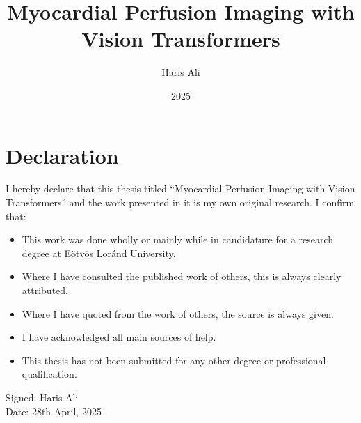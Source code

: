 \documentclass[
]{elteikthesis}[2024/04/26]
\title{Myocardial Perfusion Imaging with Vision Transformers} %
\date{2025} %
\author{Haris Ali}
\affiliation{PhD Candidate} %
\begin{document}


\maketitle
%

\chapter*{Declaration}

I hereby declare that this thesis titled “Myocardial Perfusion Imaging with Vision Transformers” and the work presented in it is my own original research. I confirm that:

\begin{itemize}
    \item This work was done wholly or mainly while in candidature for a research degree at Eötvös Loránd University.
    \item Where I have consulted the published work of others, this is always clearly attributed.
    \item Where I have quoted from the work of others, the source is always given.
    \item I have acknowledged all main sources of help.
    \item This thesis has not been submitted for any other degree or professional qualification.
\end{itemize}

\vspace{1cm}
\noindent
Signed: Haris Ali \\
\vspace{0.1cm}
Date: 28th April, 2025


\cleardoublepage

\tableofcontents
\cleardoublepage


\cleardoublepage


\cleardoublepage


\cleardoublepage


\cleardoublepage
\end{document}
